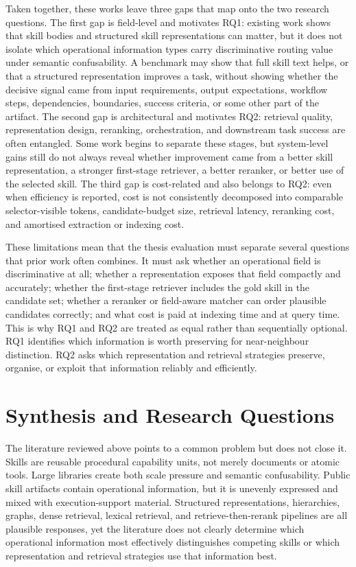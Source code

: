 Taken together, these works leave three gaps that map onto the two research questions. The first gap is field-level and motivates RQ1: existing work shows that skill bodies and structured skill representations can matter, but it does not isolate which operational information types carry discriminative routing value under semantic confusability. A benchmark may show that full skill text helps, or that a structured representation improves a task, without showing whether the decisive signal came from input requirements, output expectations, workflow steps, dependencies, boundaries, success criteria, or some other part of the artifact. The second gap is architectural and motivates RQ2: retrieval quality, representation design, reranking, orchestration, and downstream task success are often entangled. Some work begins to separate these stages, but system-level gains still do not always reveal whether improvement came from a better skill representation, a stronger first-stage retriever, a better reranker, or better use of the selected skill. The third gap is cost-related and also belongs to RQ2: even when efficiency is reported, cost is not consistently decomposed into comparable selector-visible tokens, candidate-budget size, retrieval latency, reranking cost, and amortised extraction or indexing cost.

These limitations mean that the thesis evaluation must separate several questions that prior work often combines. It must ask whether an operational field is discriminative at all; whether a representation exposes that field compactly and accurately; whether the first-stage retriever includes the gold skill in the candidate set; whether a reranker or field-aware matcher can order plausible candidates correctly; and what cost is paid at indexing time and at query time. This is why RQ1 and RQ2 are treated as equal rather than sequentially optional. RQ1 identifies which information is worth preserving for near-neighbour distinction. RQ2 asks which representation and retrieval strategies preserve, organise, or exploit that information reliably and efficiently.

\section{Synthesis and Research Questions}

The literature reviewed above points to a common problem but does not close it. Skills are reusable procedural capability units, not merely documents or atomic tools. Large libraries create both scale pressure and semantic confusability. Public skill artifacts contain operational information, but it is unevenly expressed and mixed with execution-support material. Structured representations, hierarchies, graphs, dense retrieval, lexical retrieval, and retrieve-then-rerank pipelines are all plausible responses, yet the literature does not clearly determine which operational information most effectively distinguishes competing skills or which representation and retrieval strategies use that information best.

